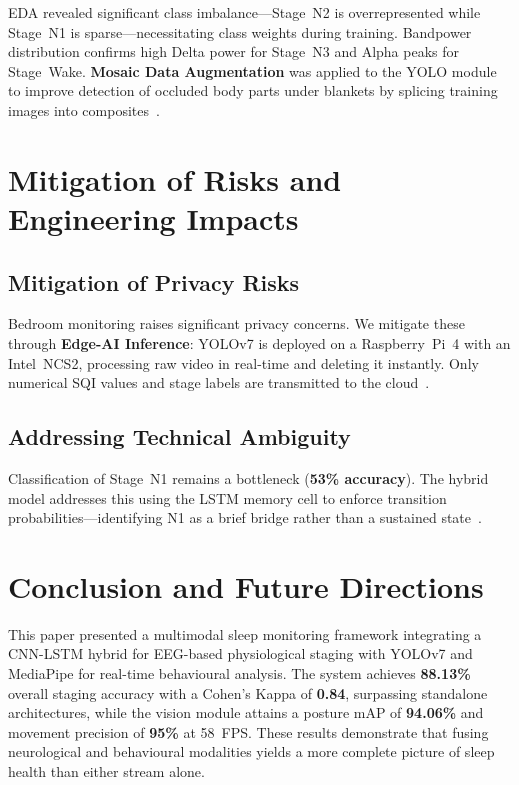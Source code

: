 \documentclass[10pt, a4paper, twocolumn]{article}
\begin{document}
EDA revealed significant class imbalance---Stage~N2 is overrepresented while
Stage~N1 is sparse---necessitating class weights during training. Bandpower
distribution confirms high Delta power for Stage~N3 and Alpha peaks for Stage~Wake.
\textbf{Mosaic Data Augmentation} was applied to the YOLO module to improve
detection of occluded body parts under blankets by splicing training images into
composites~\cite{ref9}.

\section{Mitigation of Risks and Engineering Impacts}

\subsection{Mitigation of Privacy Risks}

Bedroom monitoring raises significant privacy concerns. We mitigate these through
\textbf{Edge-AI Inference}: YOLOv7 is deployed on a Raspberry~Pi~4 with an
Intel~NCS2, processing raw video in real-time and deleting it instantly. Only
numerical SQI values and stage labels are transmitted to the cloud~\cite{ref9}.

\subsection{Addressing Technical Ambiguity}

Classification of Stage~N1 remains a bottleneck (\textbf{53\% accuracy}). The hybrid
model addresses this using the LSTM memory cell to enforce transition
probabilities---identifying N1 as a brief bridge rather than a sustained
state~\cite{ref2}.

\section{Conclusion and Future Directions}

This paper presented a multimodal sleep monitoring framework integrating a CNN-LSTM
hybrid for EEG-based physiological staging with YOLOv7 and MediaPipe for real-time
behavioural analysis. The system achieves \textbf{88.13\%} overall staging accuracy
with a Cohen's Kappa of \textbf{0.84}, surpassing standalone architectures, while
the vision module attains a posture mAP of \textbf{94.06\%} and movement precision
of \textbf{95\%} at 58~FPS. These results demonstrate that fusing neurological and
behavioural modalities yields a more complete picture of sleep health than either
stream alone.
\end{document}
